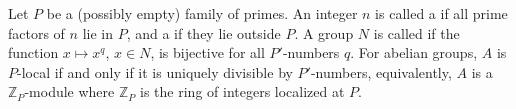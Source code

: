 Let $P$ be a (possibly empty) family of primes. An integer $n$ is called a  if all prime factors of $n$ lie in $P$, and a  if they lie outside $P$. A group $N$ is called  if the function $x \mapsto x^q$, $x \in N$, is bijective for all $P'$-numbers $q$. For abelian groups, $A$ is $P$-local if and only if it is uniquely divisible by $P'$-numbers, equivalently, $A$ is a $\mathbb{Z}_P$-module where $\mathbb{Z}_P$ is the ring of integers localized at $P$.
